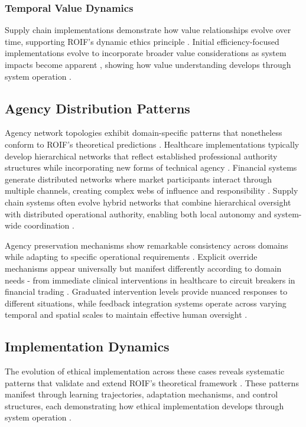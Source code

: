 \documentclass[12pt]{article}
\begin{document}
\subsubsection{Temporal Value Dynamics}
Supply chain implementations demonstrate how value relationships evolve over time, supporting ROIF's dynamic ethics principle \parencite{seuring2008}. Initial efficiency-focused implementations evolve to incorporate broader value considerations as system impacts become apparent \parencite{gold2010}, showing how value understanding develops through system operation \parencite{pagell2009}.

\subsection{Agency Distribution Patterns}

Agency network topologies exhibit domain-specific patterns that nonetheless conform to ROIF's theoretical predictions \parencite{latour2005}. Healthcare implementations typically develop hierarchical networks that reflect established professional authority structures while incorporating new forms of technical agency \parencite{johnson2005}. Financial systems generate distributed networks where market participants interact through multiple channels, creating complex webs of influence and responsibility \parencite{mackenzie2006}. Supply chain systems often evolve hybrid networks that combine hierarchical oversight with distributed operational authority, enabling both local autonomy and system-wide coordination \parencite{lee2004}.

Agency preservation mechanisms show remarkable consistency across domains while adapting to specific operational requirements \parencite{mitchell1997}. Explicit override mechanisms appear universally but manifest differently according to domain needs - from immediate clinical interventions in healthcare to circuit breakers in financial trading \parencite{citron2014}. Graduated intervention levels provide nuanced responses to different situations, while feedback integration systems operate across varying temporal and spatial scales to maintain effective human oversight \parencite{suchman2007}.

\subsection{Implementation Dynamics}

The evolution of ethical implementation across these cases reveals systematic patterns that validate and extend ROIF's theoretical framework \parencite{miles2014}. These patterns manifest through learning trajectories, adaptation mechanisms, and control structures, each demonstrating how ethical implementation develops through system operation \parencite{nonaka1995}.
\end{document}
